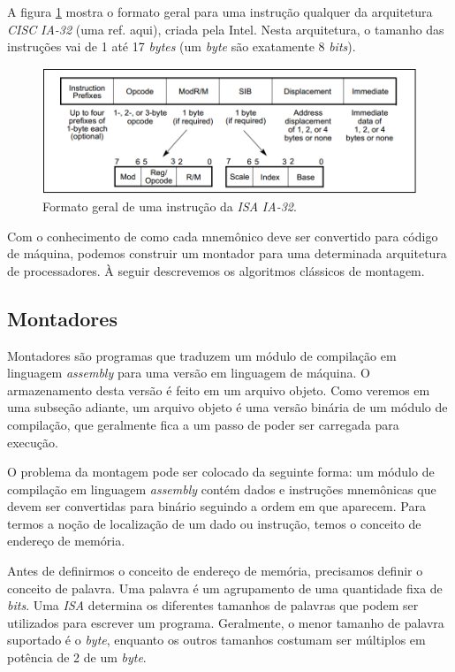 A figura \ref{instrucoes_ia32} mostra o formato geral para uma instrução
qualquer da arquitetura \textit{CISC} \textit{IA-32} (uma ref. aqui), criada
pela Intel. Nesta arquitetura, o tamanho das instruções vai de 1 até 17
\textit{bytes} (um \textit{byte} são exatamente 8 \textit{bits}).

\begin{figure}[ptb]
  \begin{center}
    \includegraphics[scale=.45]{imagens/instrucoes_ia32}
  \end{center}
  \caption{Formato geral de uma instrução da \textit{ISA} \textit{IA-32}.}
  \label{instrucoes_ia32}
\end{figure}

Com o conhecimento de como cada mnemônico deve ser convertido para código de
máquina, podemos construir um montador para uma determinada arquitetura de
processadores. À seguir descrevemos os algoritmos clássicos de montagem.

\subsection{Montadores}

Montadores são programas que traduzem um módulo de compilação em linguagem
\textit{assembly} para uma versão em linguagem de máquina. O armazenamento desta
versão é feito em um arquivo objeto. Como veremos em uma subseção adiante, um
arquivo objeto é uma versão binária de um módulo de compilação, que geralmente
fica a um passo de poder ser carregada para execução.

O problema da montagem pode ser colocado da seguinte forma: um módulo de
compilação em linguagem \textit{assembly} contém dados e instruções mnemônicas
que devem ser convertidas para binário seguindo a ordem em que aparecem. Para
termos a noção de localização de um dado ou instrução, temos o conceito de
endereço de memória.

Antes de definirmos o conceito de endereço de memória, precisamos definir o
conceito de palavra. Uma palavra é um agrupamento de uma quantidade fixa de
\textit{bits}. Uma \textit{ISA} determina os diferentes tamanhos de palavras que
podem ser utilizados para escrever um programa. Geralmente, o menor tamanho de
palavra suportado é o \textit{byte}, enquanto os outros tamanhos costumam ser
múltiplos em potência de 2 de um \textit{byte}.

